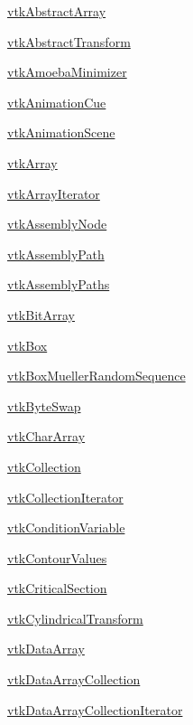 
\begin{DoxyItemize}
\item \hyperlink{vtkcommon_vtkabstractarray}{vtk\-Abstract\-Array}  
\item \hyperlink{vtkcommon_vtkabstracttransform}{vtk\-Abstract\-Transform}  
\item \hyperlink{vtkcommon_vtkamoebaminimizer}{vtk\-Amoeba\-Minimizer}  
\item \hyperlink{vtkcommon_vtkanimationcue}{vtk\-Animation\-Cue}  
\item \hyperlink{vtkcommon_vtkanimationscene}{vtk\-Animation\-Scene}  
\item \hyperlink{vtkcommon_vtkarray}{vtk\-Array}  
\item \hyperlink{vtkcommon_vtkarrayiterator}{vtk\-Array\-Iterator}  
\item \hyperlink{vtkcommon_vtkassemblynode}{vtk\-Assembly\-Node}  
\item \hyperlink{vtkcommon_vtkassemblypath}{vtk\-Assembly\-Path}  
\item \hyperlink{vtkcommon_vtkassemblypaths}{vtk\-Assembly\-Paths}  
\item \hyperlink{vtkcommon_vtkbitarray}{vtk\-Bit\-Array}  
\item \hyperlink{vtkcommon_vtkbox}{vtk\-Box}  
\item \hyperlink{vtkcommon_vtkboxmuellerrandomsequence}{vtk\-Box\-Mueller\-Random\-Sequence}  
\item \hyperlink{vtkcommon_vtkbyteswap}{vtk\-Byte\-Swap}  
\item \hyperlink{vtkcommon_vtkchararray}{vtk\-Char\-Array}  
\item \hyperlink{vtkcommon_vtkcollection}{vtk\-Collection}  
\item \hyperlink{vtkcommon_vtkcollectioniterator}{vtk\-Collection\-Iterator}  
\item \hyperlink{vtkcommon_vtkconditionvariable}{vtk\-Condition\-Variable}  
\item \hyperlink{vtkcommon_vtkcontourvalues}{vtk\-Contour\-Values}  
\item \hyperlink{vtkcommon_vtkcriticalsection}{vtk\-Critical\-Section}  
\item \hyperlink{vtkcommon_vtkcylindricaltransform}{vtk\-Cylindrical\-Transform}  
\item \hyperlink{vtkcommon_vtkdataarray}{vtk\-Data\-Array}  
\item \hyperlink{vtkcommon_vtkdataarraycollection}{vtk\-Data\-Array\-Collection}  
\item \hyperlink{vtkcommon_vtkdataarraycollectioniterator}{vtk\-Data\-Array\-Collection\-Iterator}  

\end{DoxyItemize}
